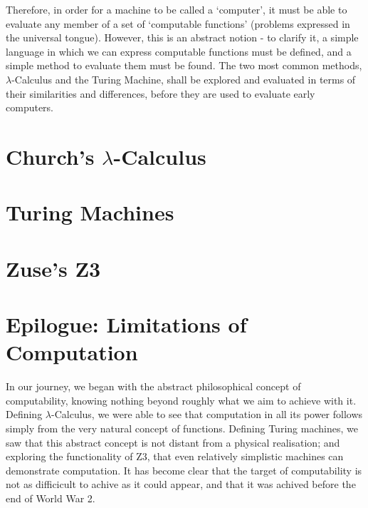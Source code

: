 \documentclass {article}
\begin{document}
Therefore, in order for a machine to be called a `computer', it must be able to evaluate any member of a set of `computable functions' (problems expressed in the universal tongue). However, this is an abstract notion - to clarify it, a simple language in which we can express computable functions must be defined, and a simple method to evaluate them must be found. The two most common methods, $\lambda$-Calculus and the Turing Machine, shall be explored and evaluated in terms of their similarities and differences, before they are used to evaluate early computers.



\section{Church's $\lambda$-Calculus}



\section{Turing Machines}



\section{Zuse's Z3}



\section*{Epilogue: Limitations of Computation}

In our journey, we began with the abstract philosophical concept of computability, knowing nothing beyond roughly what we aim to achieve with it. Defining $\lambda$-Calculus, we were able to see that computation in all its power follows simply from the very natural concept of functions. Defining Turing machines, we saw that this abstract concept is not distant from a physical realisation; and exploring the functionality of Z3, that even relatively simplistic machines can demonstrate computation. It has become clear that the target of computability is not as difficicult to achive as it could appear, and that it was achived before the end of World War 2.
\end{document}
